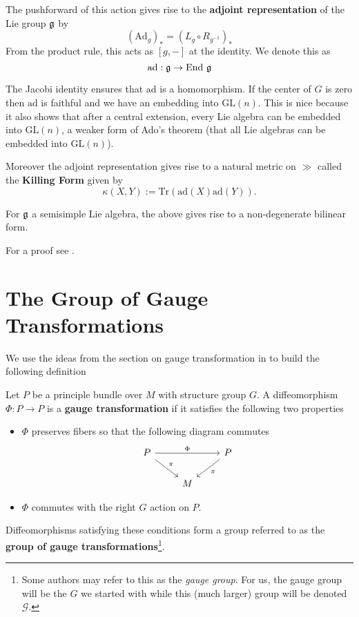 		\begin{defn}
			The pushforward of this action gives rise to the \textbf{adjoint representation} of the Lie group $\frak g$ by
			\[
				(\mathrm{Ad}_g)_* = (L_g \circ R_{g^{-1}})_* 
			\]
			From the product rule, this acts as $[g, -]$ at the identity. We denote this as
			\[
				\mathrm{ad}: \frak g \rightarrow \mathrm{End}~ \frak g
			\]
		\end{defn}
		
		The Jacobi identity ensures that $\mathrm{ad}$ is a homomorphism. If the center of $G$ is zero then $\mathrm{ad}$ is faithful and we have an embedding into $\mathrm{GL}(n)$. This is nice because it also shows that after a central extension, every Lie algebra can be embedded into $\mathrm{GL}(n)$, a weaker form of Ado's theorem (that all Lie algebras can be embedded into $\mathrm{GL}(n)$).
		
		Moreover the adjoint representation gives rise to a natural metric on $\gg$ called the \textbf{Killing Form} given by
		\begin{equation}
			\kappa (X, Y) := \mathrm{Tr}(\mathrm{ad}(X) \mathrm{ad}(Y)).
		\end{equation}
		
		\begin{prop}
			For $\frak g$ a semisimple Lie algebra, the above gives rise to a non-degenerate bilinear form. 
		\end{prop}
		For a proof see \cite{humphreys2012}.
		
		\section{The Group of Gauge Transformations}
		
		We use the ideas from the section on gauge transformation in \cite{lindenhovius2011} to build the following definition
		\begin{defn}
			Let $P$ be a principle bundle over $M$ with structure group $G$. A diffeomorphism $\Phi: P \to P$ is a \textbf{gauge transformation} if it satisfies the following two properties
			\begin{itemize}
				\item $\Phi$ preserves fibers so that the following diagram commutes
				\[
					\begin{tikzcd}
						P \arrow[rr,"\Phi"] \arrow[rd,"\pi"] & & P \arrow[ld,"\pi"]\\
						& M &
					\end{tikzcd}
				\]
				\item $\Phi$ commutes with the right $G$ action on $P$. 
			\end{itemize}
		\end{defn}
		Diffeomorphisms satisfying these conditions form a group referred to as the \textbf{group of gauge transformations}\footnote{Some authors may refer to this as the \emph{gauge group}. For us, the gauge group will be the $G$ we started with while this (much larger) group will be denoted $\mathcal G$.}. 
		

